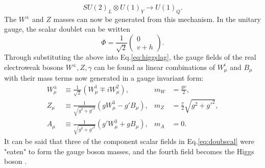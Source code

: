 \documentclass[a4paper,12pt]{article}
\begin{document}
\begin{equation}
    \label{eq:symbreak}
    SU(2)_L\otimes U(1)_Y \to U(1)_Q.
\end{equation}
The $W^\pm$ and $Z$ masses can now be generated from this mechanism. 
In the unitary gauge, the scalar doublet can be written
\begin{equation}
    \label{eq:unig}
    \Phi = \frac{1}{\sqrt{2}}\begin{pmatrix}0\\v+h\end{pmatrix}.
\end{equation}
Through substituting the above into Eq.\eqref{eq:higgslag}, the gauge fields of the real electroweak bosons $W^{\pm},Z,\gamma$ can be found as linear combinations of $W^i_\mu$ and $B_\mu$ with their mass terms now generated in a gauge invariant form:
\begin{align}
    \label{eq:gagmix}
    W^\pm_\mu &\equiv \frac{1}{\sqrt{2}}(W_\mu^1 \mp iW_\mu^2), & m_W &= \frac{gv}{2}, \\
    Z_\mu &\equiv \frac{1}{\sqrt{g^2+g'^2}}(gW^3_\mu-g'B_\mu), & m_Z &= \frac{v}{2}\sqrt{g^2+g'^2},\\
    A_\mu &\equiv \frac{1}{\sqrt{g^2+g'^2}}(g'W_\mu^3+gB_\mu), & m_A &= 0.
\end{align}
It can be said that three of the component scalar fields in Eq.\eqref{eq:doubscal} were "eaten" to form the gauge boson masses, and the fourth field becomes the Higgs boson \cite{higgs}.
\end{document}
